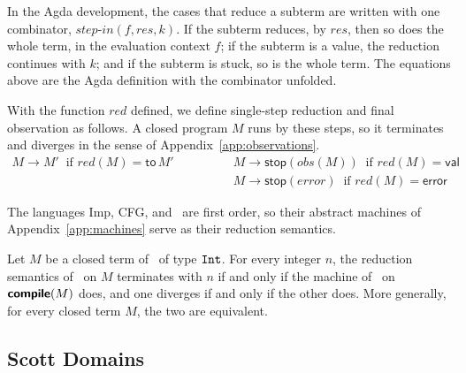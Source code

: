 In the Agda development, the cases that reduce a subterm are written with one
combinator, $\mathit{step\text{-}in}(f, \mathit{res}, k)$. If the subterm reduces, by $\mathit{res}$,
then so does the whole term, in the evaluation context $f$; if the subterm is a
value, the reduction continues with $k$; and if the subterm is stuck, so is the
whole term. The equations above are the Agda definition with the combinator
unfolded.

With the function $\mathit{red}$ defined, we define single-step reduction and
final observation as follows. A closed program $M$ runs by these steps, so it
terminates and diverges in the sense of Appendix~\ref{app:observations}.
\vspace{-10pt}
\begin{align*}
  M \longrightarrow M' \ \text{ if } \mathit{red}(M) = \mathsf{to}\,M'
  \qquad\qquad
  & M \longrightarrow \mathsf{stop}(\mathit{obs}(M)) \ \text{ if } \mathit{red}(M) = \mathsf{val} \\
  & M \longrightarrow \mathsf{stop}(\mathit{error}) \ \text{ if } \mathit{red}(M) = \mathsf{error}
\end{align*}

The languages Imp, CFG, and \instr\ are first order, so their abstract machines
of Appendix~\ref{app:machines} serve as their reduction semantics.


\begin{proposition}\label{prop:reduction}
Let $M$ be a closed term of \fpc\ of type $\mathtt{Int}$. For every integer $n$, the reduction semantics of \fpc\ on $M$ terminates with $n$ if and only if the machine of \instr\ on $\textsf{\bfseries compile}(M)$ does, and one diverges if and only if the other does. More generally, for every closed term $M$, the two are equivalent.
\end{proposition}

\subsection{Scott Domains}
\label{app:scott}

